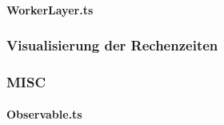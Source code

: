 \paragraph{WorkerLayer.ts}

\subsubsection{Visualisierung der Rechenzeiten} %

\subsubsection{MISC} %
\paragraph{Observable.ts} \label{par:observables}